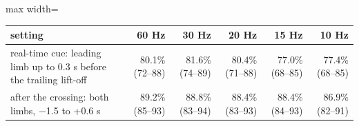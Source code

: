 \begin{adjustbox}{max width=\textwidth}
{\footnotesize
\begin{tabular}{p{4.4cm}rrrrr}
\toprule
\textbf{setting} & \textbf{60 Hz} & \textbf{30 Hz} & \textbf{20 Hz} & \textbf{15 Hz} & \textbf{10 Hz} \\
\midrule
real-time cue: leading limb up to 0.3 s before the trailing lift-off & 80.1\% (72--88) & 81.6\% (74--89) & 80.4\% (71--88) & 77.0\% (68--85) & 77.4\% (68--85) \\
after the crossing: both limbs, $-$1.5 to +0.6 s & 89.2\% (85--93) & 88.8\% (83--94) & 88.4\% (83--93) & 88.4\% (84--93) & 86.9\% (82--91) \\
\bottomrule
\end{tabular}
}
\end{adjustbox}
